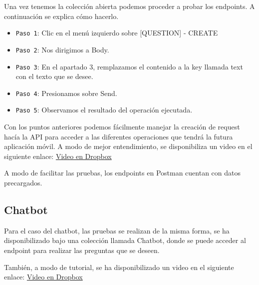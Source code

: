 Una vez tenemos la colección abierta podemos proceder a probar los endpoints. A continuación se explica cómo hacerlo.

\begin{itemize}
\tightlist
\item
  \texttt{Paso 1}: Clic en el menú izquierdo sobre [QUESTION] - CREATE
  \item
  \texttt{Paso 2}: Nos dirigimos a Body.
  \item
  \texttt{Paso 3}: En el apartado 3, remplazamos el contenido a la key llamada text con el texto que se desee.
  \item
  \texttt{Paso  4}: Presionamos sobre Send.
    \item
  \texttt{Paso  5}: Observamos el resultado del operación ejecutada.
\end{itemize}

Con los puntos anteriores podemos fácilmente manejar la creación de request hacía la API para acceder a las diferentes operaciones que tendrá la futura aplicación móvil.
A modo de mejor entendimiento, se disponibiliza un video en el siguiente enlace:
\href{https://www.dropbox.com/s/3b3uwcgpcwrhlkx/grabacion_question_answer.mov?dl=0}{Video en Dropbox}

A modo de facilitar las pruebas, los endpoints en Postman cuentan con datos precargados.

\subsection{Chatbot}

Para el caso del chatbot, las pruebas se realizan de la misma forma, se ha disponibilizado bajo una colección llamada Chatbot, donde se puede acceder al endpoint para realizar las preguntas que se deseen.

También, a modo de tutorial, se ha disponibilizado un video en el siguiente enlace:
\href{https://www.dropbox.com/s/hgilnzncrb17aju/chatbot.mov?dl=0}{Video en Dropbox}





